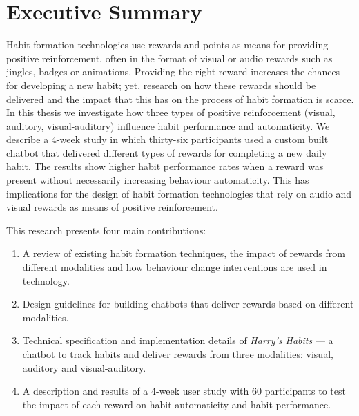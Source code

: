 
\section*{Executive Summary}
Habit formation technologies use rewards and points as means for providing positive reinforcement, often in the format of visual or audio rewards such as jingles, badges or animations. Providing the right reward increases the chances for developing a new habit; yet, research on how these rewards should be delivered and the impact that this has on the process of habit formation is scarce. In this thesis we investigate how three types of positive reinforcement (visual, auditory, visual-auditory) influence habit performance and automaticity. We describe a 4-week study in which thirty-six participants used a custom built chatbot that delivered different types of rewards for completing a new daily habit. The results show higher habit performance rates when a reward was present without necessarily increasing behaviour automaticity. This has implications for the design of habit formation technologies that rely on audio and visual rewards as means of positive reinforcement.

This research presents four main contributions:

\begin{enumerate}
  \item A review of existing habit formation techniques, the impact of rewards from different modalities and how behaviour change interventions are used in technology.
  \item Design guidelines for building chatbots that deliver rewards based on different modalities.
  \item Technical specification and implementation details of \textit{Harry's Habits} --- a chatbot to track habits and deliver rewards from three modalities: visual, auditory and visual-auditory.
  \item A description and results of a 4-week user study with 60 participants to test the impact of each reward on habit automaticity and habit performance.
\end{enumerate}

\newpage
